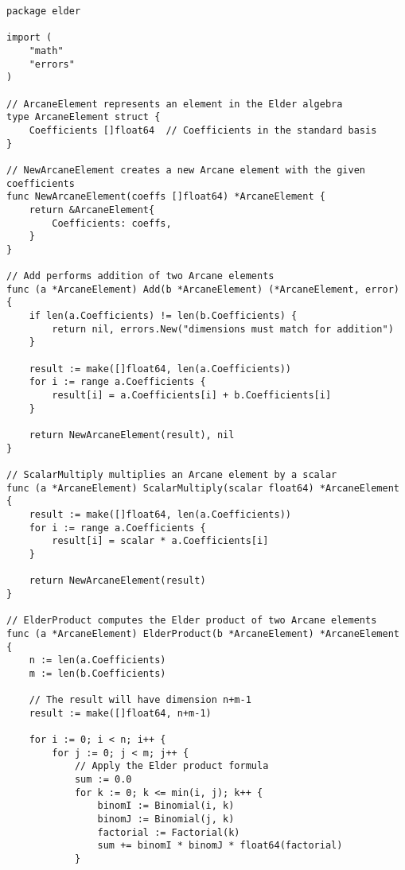 
\begin{lstlisting}[language=golang, caption={Implementation of Elder Algebra in GoLang}]
package elder

import (
    "math"
    "errors"
)

// ArcaneElement represents an element in the Elder algebra
type ArcaneElement struct {
    Coefficients []float64  // Coefficients in the standard basis
}

// NewArcaneElement creates a new Arcane element with the given coefficients
func NewArcaneElement(coeffs []float64) *ArcaneElement {
    return &ArcaneElement{
        Coefficients: coeffs,
    }
}

// Add performs addition of two Arcane elements
func (a *ArcaneElement) Add(b *ArcaneElement) (*ArcaneElement, error) {
    if len(a.Coefficients) != len(b.Coefficients) {
        return nil, errors.New("dimensions must match for addition")
    }
    
    result := make([]float64, len(a.Coefficients))
    for i := range a.Coefficients {
        result[i] = a.Coefficients[i] + b.Coefficients[i]
    }
    
    return NewArcaneElement(result), nil
}

// ScalarMultiply multiplies an Arcane element by a scalar
func (a *ArcaneElement) ScalarMultiply(scalar float64) *ArcaneElement {
    result := make([]float64, len(a.Coefficients))
    for i := range a.Coefficients {
        result[i] = scalar * a.Coefficients[i]
    }
    
    return NewArcaneElement(result)
}

// ElderProduct computes the Elder product of two Arcane elements
func (a *ArcaneElement) ElderProduct(b *ArcaneElement) *ArcaneElement {
    n := len(a.Coefficients)
    m := len(b.Coefficients)
    
    // The result will have dimension n+m-1
    result := make([]float64, n+m-1)
    
    for i := 0; i < n; i++ {
        for j := 0; j < m; j++ {
            // Apply the Elder product formula
            sum := 0.0
            for k := 0; k <= min(i, j); k++ {
                binomI := Binomial(i, k)
                binomJ := Binomial(j, k)
                factorial := Factorial(k)
                sum += binomI * binomJ * float64(factorial)
            }
            

\end{lstlisting}
